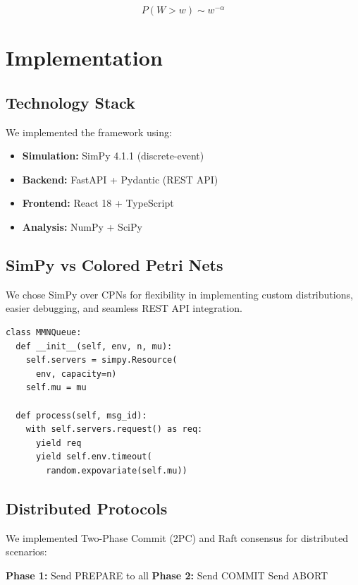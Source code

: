 \documentclass[conference,twocolumn]{IEEEtran}
\begin{document}
\begin{equation}
P(W > w) \sim w^{-\alpha}
\end{equation}

\section{Implementation}

\subsection{Technology Stack}

We implemented the framework using:
\begin{itemize}[leftmargin=*]
    \item \textbf{Simulation:} SimPy 4.1.1 (discrete-event)
    \item \textbf{Backend:} FastAPI + Pydantic (REST API)
    \item \textbf{Frontend:} React 18 + TypeScript
    \item \textbf{Analysis:} NumPy + SciPy
\end{itemize}

\subsection{SimPy vs Colored Petri Nets}

We chose SimPy over CPNs for flexibility in implementing custom distributions, easier debugging, and seamless REST API integration.

\begin{lstlisting}[style=python, caption={M/M/N Queue Implementation}]
class MMNQueue:
  def __init__(self, env, n, mu):
    self.servers = simpy.Resource(
      env, capacity=n)
    self.mu = mu
    
  def process(self, msg_id):
    with self.servers.request() as req:
      yield req
      yield self.env.timeout(
        random.expovariate(self.mu))
\end{lstlisting}

\subsection{Distributed Protocols}

We implemented Two-Phase Commit (2PC) and Raft consensus for distributed scenarios:

\begin{algorithm}[h]
\caption{Two-Phase Commit}
\begin{algorithmic}[1]
\State \textbf{Phase 1:} Send PREPARE to all
    \State \textbf{Phase 2:} Send COMMIT
\Else
    \State Send ABORT
\EndIf
\EndProcedure
\end{algorithmic}
\end{algorithm}
\end{document}
